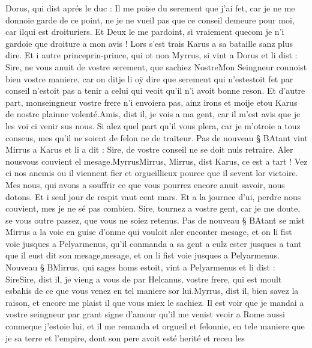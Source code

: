\documentclass{article}
\begin{document}
\begin{pages}
   Dorus, qui dist aprés le duc :
   Il me poise du serement que j’ai fet, car je ne me donnoie garde de ce point, 
      ne je ne vueil pas que ce conseil demeure pour moi, car ilqui est 
      droituriers. Et Deux le me pardoint, si vraiement quecom 
   je n’i gardoie que droiture a mon avis !
   Lors s’est trais Karus a sa bataille sanz plus dire. 
   Et i autre princeprin-prince, qui 
   ot non Myrrus, 
   si vint a Dorus et li dist :
   Sire, ne vous anuit de vostre serement, que sachiez 
      NostreMon Seingneur 
      connoist bien vostre maniere, 
      car on ditje li oÿ dire que serement qui 
      n’estestoit fet par conseil n’estoit pas a tenir a celui 
      qui veoit qu’il n’i avoit bonne reson. Et d’autre part, monseingneur vostre frere n’i 
      envoiera pas, ainz irons et moije 
      etou 
      Karus de nostre plainne volenté.Amis, dist il, je vois a ma gent, car il m’est avis que je les voi ci venir sus nous. Si alez quel 
      part qu’il vous plera, car je m’otroie a touz conseus, mes qu’il ne soient 
      de felon ne de traïteur. \pend
\pstart Pas de nouveau § BAtant vint Mirrus a Karus et li a dit :
   Sire, de vostre conseil ne se doit nuls retraire. Aler 
      nousvous couvient el mesage.MyrrusMirrus, Mirrus, 
      dist Karus, ce est a tart ! 
   Vez ci nos anemis ou il viennent fier et orgueillieux pource que il sevent lor victoire. Mes nous, qui avons a souffrir ce que vous 
   pourrez encore anuit savoir, nous dotons. Et i seul jour de respit vaut cent mars. Et a la journee d’ui, perdre nous 
      couvient, mes je ne sé pas combien. Sire, tournez a vostre gent, 
      car je me doute, se vous outre passez, que vous ne soiez retenus. \pend
\pstart Pas de nouveau § BAtant se mist Mirrus 
   a la voie en guise d’onme qui vouloit aler enconter mesage, 
   et on li fist voie jusques a Pelyarmenus, qu’il conmanda 
   a sa gent 
   a
   eulz ester jusques a tant que il eust dit son 
   mesage,mesage, et on li fist voie jusques a Pelyarmenus. 
   Nouveau § BMirrus, qui sages homs estoit, vint a 
      Pelyarmenus et li dist :
   SireSire, dist il, je vieng a 
      vous de par Helcanus, vostre frere, 
   qui est moult esbahis de ce que vous venez en tel maniere sor lui.Myrrus, dist il, bien savez la raison, 
      et encore me plaist il que vous miex le sachiez. 
   Il est voir que je mandai a vostre seingneur par grant signe d’amour qu’il me venist veoir a 
      Rome aussi conmeque j’estoie lui, 
      et il me remanda et orgueil et felonnie, 
   en tele maniere que je sa terre et l’empire, dont son pere avoit esté herité et receu les 

\end{pages}
\end{document}
